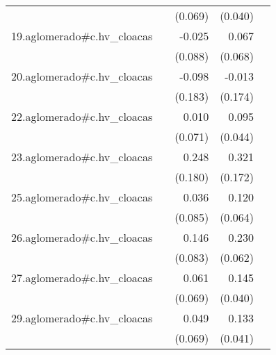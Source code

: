 {\begin{longtable}{l*{4}{D{.}{.}{-1}}}
            &                     &     (0.069)         &     (0.040)         &                     \\
\addlinespace
19.aglomerado#c.hv\_cloacas&                     &      -0.025         &       0.067         &                     \\
            &                     &     (0.088)         &     (0.068)         &                     \\
\addlinespace
20.aglomerado#c.hv\_cloacas&                     &      -0.098         &      -0.013         &                     \\
            &                     &     (0.183)         &     (0.174)         &                     \\
\addlinespace
22.aglomerado#c.hv\_cloacas&                     &       0.010         &       0.095\sym{*}  &                     \\
            &                     &     (0.071)         &     (0.044)         &                     \\
\addlinespace
23.aglomerado#c.hv\_cloacas&                     &       0.248         &       0.321         &                     \\
            &                     &     (0.180)         &     (0.172)         &                     \\
\addlinespace
25.aglomerado#c.hv\_cloacas&                     &       0.036         &       0.120         &                     \\
            &                     &     (0.085)         &     (0.064)         &                     \\
\addlinespace
26.aglomerado#c.hv\_cloacas&                     &       0.146         &       0.230\sym{***}&                     \\
            &                     &     (0.083)         &     (0.062)         &                     \\
\addlinespace
27.aglomerado#c.hv\_cloacas&                     &       0.061         &       0.145\sym{***}&                     \\
            &                     &     (0.069)         &     (0.040)         &                     \\
\addlinespace
29.aglomerado#c.hv\_cloacas&                     &       0.049         &       0.133\sym{**} &                     \\
            &                     &     (0.069)         &     (0.041)         &                     \\

\end{longtable}}
